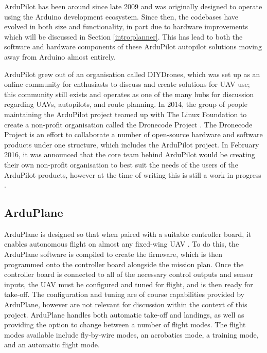 ArduPilot has been around since late 2009 and was originally designed to operate using the Arduino development ecosystem. Since then, the codebases have evolved in both size and functionality, in part due to hardware improvements which will be discussed in Section \ref{intro:planner}. This has lead to both the software and hardware components of these ArduPilot autopilot solutions moving away from Arduino almost entirely.

ArduPilot grew out of an organisation called DIYDrones, which was set up as an online community for enthusiasts to discuss and create solutions for UAV use; this community still exists and operates as one of the many hubs for discussion regarding UAVs, autopilots, and route planning. In 2014, the group of people maintaining the ArduPilot project teamed up with The Linux Foundation to create a non-profit organisation called the Dronecode Project \cite{Dronecode}. The Dronecode Project is an effort to collaborate a number of open-source hardware and software products under one structure, which includes the ArduPilot project. In February 2016, it was announced that the core team behind ArduPilot would be creating their own non-profit organisation to best suit the needs of the users of the ArduPilot products, however at the time of writing this is still a work in progress \cite{ArduNonProfit}.

\subsection{ArduPlane}
\label{intro:arduplane}

ArduPlane is designed so that when paired with a suitable controller board, it enables autonomous flight on almost any fixed-wing UAV \cite{ArduPlaneHome}. To do this, the ArduPlane software is compiled to create the firmware, which is then programmed onto the controller board alongside the mission plan. Once the controller board is connected to all of the necessary control outputs and sensor inputs, the UAV must be configured and tuned for flight, and is then ready for take-off. The configuration and tuning are of course capabilities provided by ArduPlane, however are not relevant for discussion within the context of this project. ArduPlane handles both automatic take-off and landings, as well as providing the option to change between a number of flight modes. The flight modes available include fly-by-wire modes, an acrobatics mode, a training mode, and an automatic flight mode.

